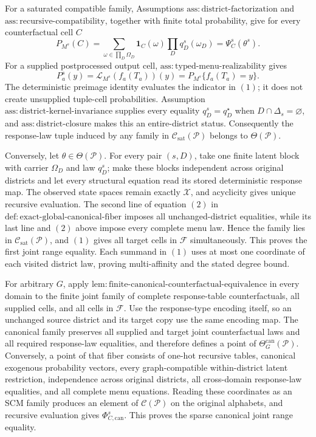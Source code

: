 For a saturated compatible family, Assumptions
\(\mathrm{ass:district\text{-}factorization}\) and
\(\mathrm{ass:recursive\text{-}compatibility}\), together with finite total
probability, give for every counterfactual cell \(C\)
\[
P_{M^s}(C)=
\sum_{\omega\in\prod_D\Omega_D}
\mathbf1_C(\omega)\prod_Dq_D^s(\omega_D)
=\Psi_C^s(\theta^s).
\tag{1}
\]
For a supplied postprocessed output cell,
\(\mathrm{ass:typed\text{-}menu\text{-}realizability}\) gives
\[
P_a^s(y)=\mathcal L_{M^s}(f_a(T_a))(y)
=P_{M^s}\{f_a(T_a)=y\}.
\tag{2}
\]
The deterministic preimage identity evaluates the indicator in \((1)\); it does
not create unsupplied tuple-cell probabilities.  Assumption
\(\mathrm{ass:district\text{-}kernel\text{-}invariance}\) supplies every equality
\(q_D^s=q_D^\star\) when \(D\cap\Delta_s=\varnothing\), and
\(\mathrm{ass:district\text{-}closure}\) makes this an entire-district status.
Consequently the response-law tuple induced by any family in
\(\mathcal C_{\mathrm{sat}}(\mathcal P)\) belongs to
\(\Theta(\mathcal P)\).

Conversely, let \(\theta\in\Theta(\mathcal P)\).  For every pair \((s,D)\), take
one finite latent block with carrier \(\Omega_D\) and law \(q_D^s\); make these
blocks independent across original districts and let every structural equation read
its stored deterministic response map.  The observed state spaces remain exactly
\(\mathcal X\), and acyclicity gives unique recursive evaluation.  The second line
of equation \((2)\) in
\(\mathrm{def:exact\text{-}global\text{-}canonical\text{-}fiber}\) imposes all
unchanged-district equalities, while its last line and \((2)\) above impose every
complete menu law.  Hence the family lies in
\(\mathcal C_{\mathrm{sat}}(\mathcal P)\), and \((1)\) gives all target cells in
\(\mathcal F\) simultaneously.  This proves the first joint range equality.  Each
summand in \((1)\) uses at most one coordinate of each visited district law, proving
multi-affinity and the stated degree bound.

For arbitrary \(G\), apply
\(\mathrm{lem:finite\text{-}canonical\text{-}counterfactual\text{-}equivalence}\)
in every domain to the finite joint family of complete response-table
counterfactuals, all supplied cells, and all cells in \(\mathcal F\).  Use the
response-type encoding itself, so an unchanged source district and its target copy
use the same encoding map.  The canonical family preserves all supplied and target
joint counterfactual laws and all required response-law equalities, and therefore
defines a point of \(\Theta_G^{\mathrm{can}}(\mathcal P)\).  Conversely, a point of
that fiber consists of one-hot recursive tables, canonical exogenous probability
vectors, every graph-compatible within-district latent restriction, independence
across original districts, all cross-domain response-law equalities, and all
complete menu equations.  Reading these coordinates as an SCM family produces an
element of \(\mathcal C(\mathcal P)\) on the original alphabets, and recursive
evaluation gives \(\Phi_{C,\mathrm{can}}^s\).  This proves the sparse canonical
joint range equality.


